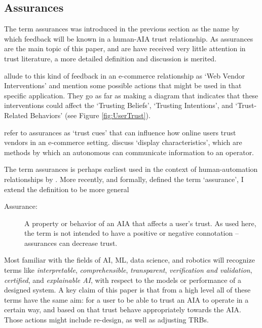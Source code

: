 \subsection{Assurances}
    The term assurances was introduced in the previous section as the name by which feedback will be known in a human-AIA trust relationship. As assurances are the main topic of this paper, and are have received very little attention in trust literature, a more detailed definition and discussion is merited.

    \citet{McKnight2001-fa} allude to this kind of feedback in an e-commerce relationship as `Web Vendor Interventions' and mention some possible actions that might be used in that specific application. They go as far as making a diagram that indicates that these interventions could affect the `Trusting Beliefs', `Trusting Intentions', and `Trust-Related Behaviors' (see Figure \ref{fig:UserTrust}).

    \citet{Corritore2003-gx} refer to assurances as `trust cues' that can influence how online users trust vendors in an e-commerce setting. \citet{Lee2004-pv} discuss `display characteristics', which are methods by which an autonomous can communicate information to an operator.
    
    The term assurances is perhaps earliest used in the context of human-automation relationships by \citet{Sheridan1984-kx}. More recently, and formally, \citet{Lillard2016-yg} defined the term `assurance', I extend the definition to be more general
    
    \begin{description}
        \item [Assurance:] A property or behavior of an AIA that affects a user's trust. As used here, the term is not intended to have a positive or negative connotation -- assurances can decrease trust.
    \end{description}

    Most familiar with the fields of AI, ML, data science, and robotics will recognize terms like \emph{interpretable}, \emph{comprehensible}, \emph{transparent}, \emph{verification and validation}, \emph{certified}, and \emph{explainable AI}, with respect to the models or performance of a designed system. A key claim of this paper is that from a high level all of these terms have the same aim: for a user to be able to trust an AIA to operate in a certain way, and based on that trust behave appropriately towards the AIA. Those actions might include re-design, as well as adjusting TRBs.
%

